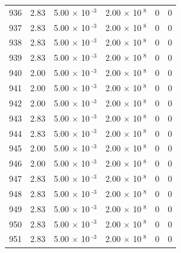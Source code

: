 \documentclass[a4paper,11pt]{article}
\begin{document}
\begin{center}
\begin{longtable}{|R{1.5cm}|R{2.4cm}|R{2.4cm}|R{2.4cm}|R{2.4cm}|R{2.4cm}|}
  936 &   2.83  &         5.00 $\times$ 10$^{\text{          -3}}$  &         2.00 $\times$ 10$^{\text{           8}}$  & 0  & 0 \\
  937 &   2.83  &         5.00 $\times$ 10$^{\text{          -3}}$  &         2.00 $\times$ 10$^{\text{           8}}$  & 0  & 0 \\
  938 &   2.83  &         5.00 $\times$ 10$^{\text{          -3}}$  &         2.00 $\times$ 10$^{\text{           8}}$  & 0  & 0 \\
  939 &   2.83  &         5.00 $\times$ 10$^{\text{          -3}}$  &         2.00 $\times$ 10$^{\text{           8}}$  & 0  & 0 \\
  940 &   2.00  &         5.00 $\times$ 10$^{\text{          -3}}$  &         2.00 $\times$ 10$^{\text{           8}}$  & 0  & 0 \\
  941 &   2.00  &         5.00 $\times$ 10$^{\text{          -3}}$  &         2.00 $\times$ 10$^{\text{           8}}$  & 0  & 0 \\
  942 &   2.00  &         5.00 $\times$ 10$^{\text{          -3}}$  &         2.00 $\times$ 10$^{\text{           8}}$  & 0  & 0 \\
  943 &   2.83  &         5.00 $\times$ 10$^{\text{          -3}}$  &         2.00 $\times$ 10$^{\text{           8}}$  & 0  & 0 \\
  944 &   2.83  &         5.00 $\times$ 10$^{\text{          -3}}$  &         2.00 $\times$ 10$^{\text{           8}}$  & 0  & 0 \\
  945 &   2.00  &         5.00 $\times$ 10$^{\text{          -3}}$  &         2.00 $\times$ 10$^{\text{           8}}$  & 0  & 0 \\
  946 &   2.00  &         5.00 $\times$ 10$^{\text{          -3}}$  &         2.00 $\times$ 10$^{\text{           8}}$  & 0  & 0 \\
  947 &   2.83  &         5.00 $\times$ 10$^{\text{          -3}}$  &         2.00 $\times$ 10$^{\text{           8}}$  & 0  & 0 \\
  948 &   2.83  &         5.00 $\times$ 10$^{\text{          -3}}$  &         2.00 $\times$ 10$^{\text{           8}}$  & 0  & 0 \\
  949 &   2.83  &         5.00 $\times$ 10$^{\text{          -3}}$  &         2.00 $\times$ 10$^{\text{           8}}$  & 0  & 0 \\
  950 &   2.83  &         5.00 $\times$ 10$^{\text{          -3}}$  &         2.00 $\times$ 10$^{\text{           8}}$  & 0  & 0 \\
  951 &   2.83  &         5.00 $\times$ 10$^{\text{          -3}}$  &         2.00 $\times$ 10$^{\text{           8}}$  & 0  & 0 \\

\end{longtable}
\end{center}
\end{document}
